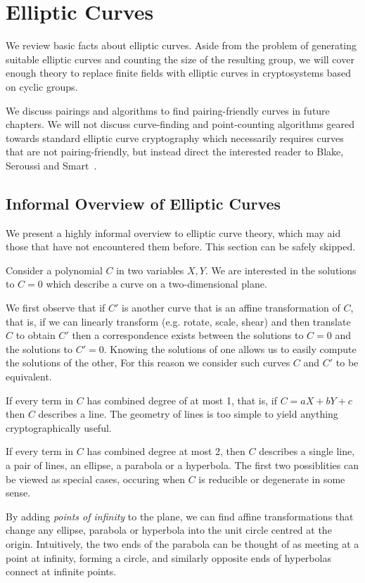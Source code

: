 \chapter {Elliptic Curves}

We review basic facts about elliptic curves.
Aside from the problem of generating suitable elliptic curves
and counting the size of the resulting group,
we will cover enough theory to replace finite fields with
elliptic curves in cryptosystems based on cyclic groups.

We discuss pairings and algorithms to find pairing-friendly curves
in future chapters. We will not
discuss curve-finding and point-counting algorithms geared
towards standard elliptic curve cryptography which necessarily requires
curves that are not pairing-friendly, but instead direct
the interested reader to Blake, Seroussi and Smart~\cite{bss}.

\section {Informal Overview of Elliptic Curves}

We present a highly informal overview to elliptic curve theory,
which may aid those that have not encountered them before.
This section can be safely skipped.

Consider a polynomial $C$ in two variables $X, Y$.
We are interested in the solutions to $C = 0$
which describe a curve on a two-dimensional plane.

We first observe that if $C'$ is another curve that is an affine transformation
of $C$, that is, if we can linearly transform (e.g. rotate, scale, shear)
and then translate $C$ to
obtain $C'$ then a correspondence exists between
the solutions to $C = 0$ and the solutions to $C' = 0$. Knowing
the solutions of one allows us to easily compute the solutions of the other,
For this reason we consider such curves $C$ and $C'$ to be equivalent.

If every term in $C$ has combined degree of at most 1, that is,
if $C = a X + b Y + c$ then $C$ describes a line. The geometry of lines
is too simple to yield anything cryptographically useful.

If every term in $C$ has combined degree at most 2, then $C$ describes
a single line, a pair of lines, an ellipse, a parabola or a hyperbola.
The first two possiblities can be viewed as special cases, occuring
when $C$ is reducible or degenerate in some sense.

By adding \emph{points of infinity} to the plane, we can find affine
transformations that change any ellipse, parabola or hyperbola into the
unit circle centred at the origin. Intuitively, the two ends of the parabola
can be thought of as meeting
at a point at infinity, forming a circle,
and similarly opposite ends of hyperbolas connect at infinite points.

